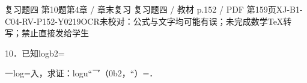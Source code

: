 \begin{bankitem}{复习题四 第10题}{第4章 / 章末复习 复习题四 / 教材 p.152 / PDF 第159页}{XJ-B1-C04-RV-P152-Y0219}{OCR未校对：公式与文字均可能有误；未完成数学TeX转写；禁止直接发给学生}
\begin{ocrdraft}
\par
10．已知logb2=
\par
一log=入，求证：logu“乛（0b2，“）=．
\end{ocrdraft}
\end{bankitem}
